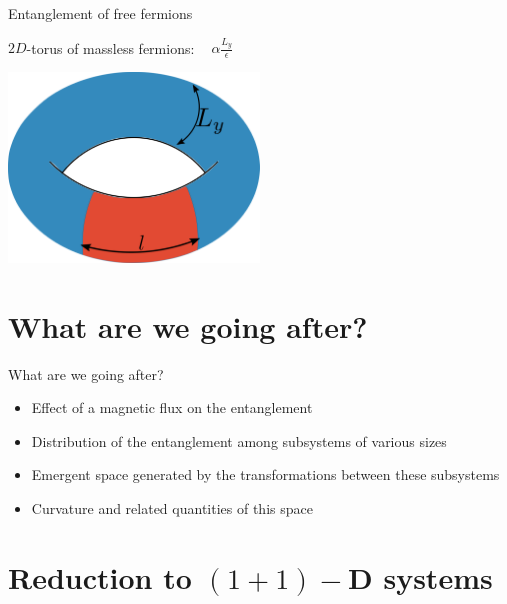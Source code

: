 \documentclass[11pt,aspectratio=169]{beamer}
\begin{document}
\begin{frame}{Entanglement of free fermions}
	\begin{minipage}{0.6\textwidth}
	\vspace{15pt}
	\(2D\)-torus of massless fermions: \(~ ~ ~ ~ \alpha \frac{L_y}{\epsilon} \)\\
	\end{minipage}
	\begin{minipage}{0.39\textwidth}
		\centering
		\includegraphics[width=0.5\textwidth]{figures/torus-EE.pdf}
	\end{minipage}
\end{frame}

\section{What are we going after?}

\begin{frame}{What are we going after?}
	\begin{itemize}
		\item Effect of a magnetic flux on the entanglement\\[20pt]
		\item Distribution of the entanglement among subsystems of various sizes\\[20pt]
		\item Emergent space generated by the transformations between these subsystems\\[20pt]
		\item Curvature and related quantities of this space
	\end{itemize}

\end{frame}

\section{Reduction to \((1+1)-\)D systems}
\end{document}
